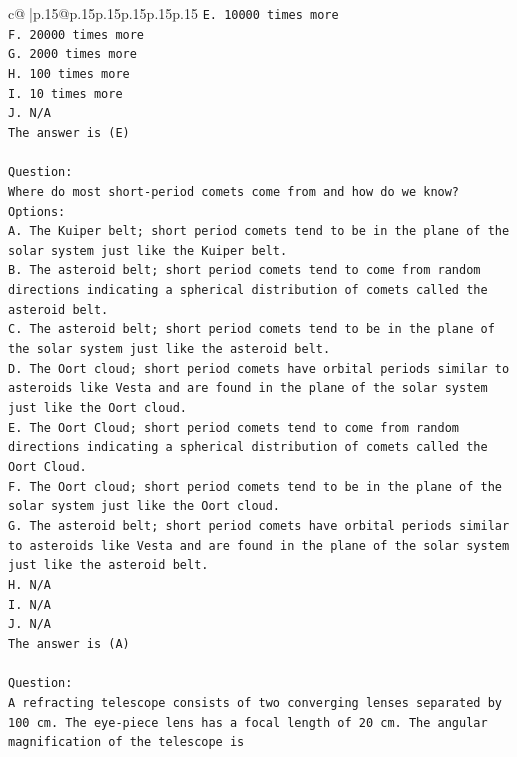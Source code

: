 \documentclass{article}
\begin{document}
{\begin{supertabular}{c@{$\;$}|p{.15\linewidth}@{}p{.15\linewidth}p{.15\linewidth}p{.15\linewidth}p{.15\linewidth}p{.15\linewidth}}
{{{\texttt{E. 10000 times more} \\
\texttt{F. 20000 times more} \\
\texttt{G. 2000 times more} \\
\texttt{H. 100 times more} \\
\texttt{I. 10 times more} \\
\texttt{J. N/A} \\
\texttt{The answer is (E)} \\
\\ 
\texttt{Question:} \\
\texttt{Where do most short{-}period comets come from and how do we know?} \\
\texttt{Options:} \\
\texttt{A. The Kuiper belt; short period comets tend to be in the plane of the solar system just like the Kuiper belt.} \\
\texttt{B. The asteroid belt; short period comets tend to come from random directions indicating a spherical distribution of comets called the asteroid belt.} \\
\texttt{C. The asteroid belt; short period comets tend to be in the plane of the solar system just like the asteroid belt.} \\
\texttt{D. The Oort cloud; short period comets have orbital periods similar to asteroids like Vesta and are found in the plane of the solar system just like the Oort cloud.} \\
\texttt{E. The Oort Cloud; short period comets tend to come from random directions indicating a spherical distribution of comets called the Oort Cloud.} \\
\texttt{F. The Oort cloud; short period comets tend to be in the plane of the solar system just like the Oort cloud.} \\
\texttt{G. The asteroid belt; short period comets have orbital periods similar to asteroids like Vesta and are found in the plane of the solar system just like the asteroid belt.} \\
\texttt{H. N/A} \\
\texttt{I. N/A} \\
\texttt{J. N/A} \\
\texttt{The answer is (A)} \\
\\ 
\texttt{Question:} \\
\texttt{A refracting telescope consists of two converging lenses separated by 100 cm. The eye{-}piece lens has a focal length of 20 cm. The angular magnification of the telescope is} \\
}}}
\end{supertabular}}
\end{document}
